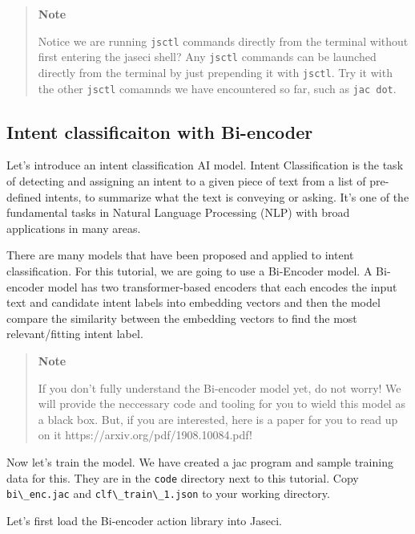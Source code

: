\begin{quote}
\textbf{Note}

Notice we are running \passthrough{\lstinline!jsctl!} commands directly
from the terminal without first entering the jaseci shell? Any
\passthrough{\lstinline!jsctl!} commands can be launched directly from
the terminal by just prepending it with \passthrough{\lstinline!jsctl!}.
Try it with the other \passthrough{\lstinline!jsctl!} comamnds we have
encountered so far, such as \passthrough{\lstinline!jac dot!}.
\end{quote}

\hypertarget{intent-classificaiton-with-bi-encoder}{%
\subsection{Intent classificaiton with
Bi-encoder}\label{intent-classificaiton-with-bi-encoder}}

Let's introduce an intent classification AI model. Intent Classification
is the task of detecting and assigning an intent to a given piece of
text from a list of pre-defined intents, to summarize what the text is
conveying or asking. It's one of the fundamental tasks in Natural
Language Processing (NLP) with broad applications in many areas.

There are many models that have been proposed and applied to intent
classification. For this tutorial, we are going to use a Bi-Encoder
model. A Bi-encoder model has two transformer-based encoders that each
encodes the input text and candidate intent labels into embedding
vectors and then the model compare the similarity between the embedding
vectors to find the most relevant/fitting intent label.

\begin{quote}
\textbf{Note}

If you don't fully understand the Bi-encoder model yet, do not worry! We
will provide the neccessary code and tooling for you to wield this model
as a black box. But, if you are interested, here is a paper for you to
read up on it https://arxiv.org/pdf/1908.10084.pdf!
\end{quote}

Now let's train the model. We have created a jac program and sample
training data for this. They are in the \passthrough{\lstinline!code!}
directory next to this tutorial. Copy
\passthrough{\lstinline!bi\_enc.jac!} and
\passthrough{\lstinline!clf\_train\_1.json!} to your working directory.

Let's first load the Bi-encoder action library into Jaseci.

